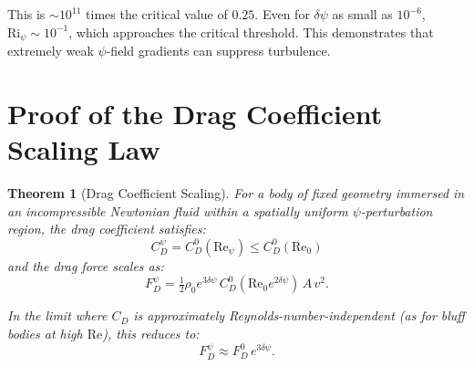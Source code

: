 \documentclass[12pt,twocolumn]{article}
\newcommand{\Rey}{\mathrm{Re}}
\newcommand{\dpsi}{\delta\psi}
\newcommand{\half}{\tfrac{1}{2}}
\newtheorem{theorem}{Theorem}
\begin{document}
This is $\sim 10^{11}$ times the critical value of $0.25$. Even for
$\dpsi$ as small as $10^{-6}$, $\mathrm{Ri}_\psi \sim 10^{-1}$, which
approaches the critical threshold. This demonstrates that extremely weak
$\psi$-field gradients can suppress turbulence.

\section{Proof of the Drag Coefficient Scaling Law}
\label{sec:cd_proof}

\begin{theorem}[Drag Coefficient Scaling]
\label{thm:cd_scaling}
For a body of fixed geometry immersed in an incompressible Newtonian fluid
within a spatially uniform $\psi$-perturbation region, the drag coefficient
satisfies:
\begin{equation}
\boxed{C_D^\psi = C_D^0(\Rey_\psi) \leq C_D^0(\Rey_0)}
\label{eq:cd_bound}
\end{equation}
and the drag \emph{force} scales as:
\begin{equation}
\boxed{F_D^\psi = \half\rho_0 e^{3\dpsi}\,C_D^0(\Rey_0 e^{2\dpsi})\,A\,v^2.}
\label{eq:fd_scaling}
\end{equation}

In the limit where $C_D$ is approximately Reynolds-number-independent
(as for bluff bodies at high $\Rey$), this reduces to:
\begin{equation}
F_D^\psi \approx F_D^0\,e^{3\dpsi}.
\label{eq:fd_simple}
\end{equation}
\end{theorem}
\end{document}
